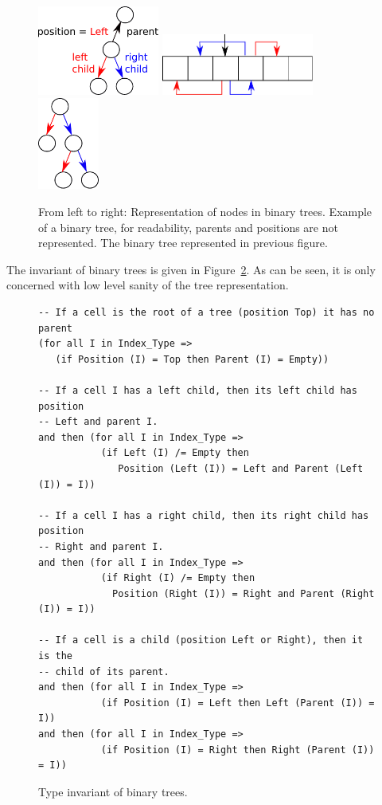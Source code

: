 \documentclass{llncs}
\begin{document}
\begin{figure}[ht]
\begin{center}
\includegraphics[width=4cm]{tree_structure.pdf}\hfill
\includegraphics[width=5cm]{binary_1.pdf}\hfill
\includegraphics[width=2cm]{binary_2.pdf}
\caption{\label{fig-binary} From left to right: Representation of nodes in binary trees.
Example of a binary tree, for readability, parents and positions are not represented.
The binary tree represented in previous figure.}
\end{center}
\end{figure}

The invariant of binary trees is given in Figure~\ref{fig-binary-inv}.
As can be seen, it is only concerned with low level sanity of the
tree representation.

\begin{figure}[ht]
\begin{small}
\begin{lstlisting}
-- If a cell is the root of a tree (position Top) it has no parent
(for all I in Index_Type =>
   (if Position (I) = Top then Parent (I) = Empty))

-- If a cell I has a left child, then its left child has position
-- Left and parent I.
and then (for all I in Index_Type =>
           (if Left (I) /= Empty then
              Position (Left (I)) = Left and Parent (Left (I)) = I))

-- If a cell I has a right child, then its right child has position
-- Right and parent I.
and then (for all I in Index_Type =>
           (if Right (I) /= Empty then
             Position (Right (I)) = Right and Parent (Right (I)) = I))

-- If a cell is a child (position Left or Right), then it is the
-- child of its parent.
and then (for all I in Index_Type =>
           (if Position (I) = Left then Left (Parent (I)) = I))
and then (for all I in Index_Type =>
           (if Position (I) = Right then Right (Parent (I)) = I))
\end{lstlisting}
\end{small}
\caption{\label{fig-binary-inv} Type invariant of binary trees.}
\end{figure}
\end{document}

